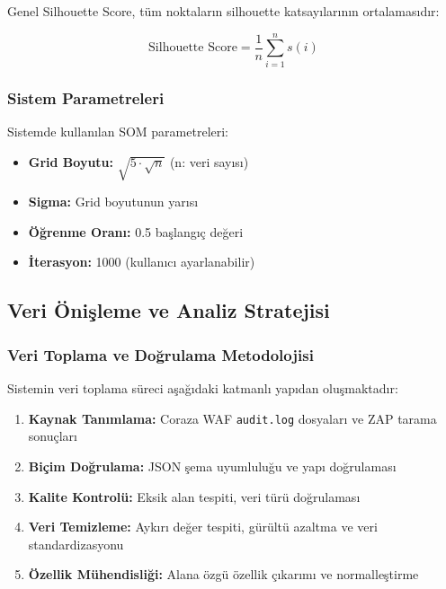 Genel Silhouette Score, tüm noktaların silhouette katsayılarının ortalamasıdır:

\begin{equation}
\text{Silhouette Score} = \frac{1}{n} \sum_{i=1}^{n} s(i)
\label{eq:overall_silhouette}
\end{equation}

\newpage

\subsubsection{Sistem Parametreleri}

Sistemde kullanılan SOM parametreleri:

\begin{itemize}
    \item \textbf{Grid Boyutu:} $\sqrt{5 \cdot \sqrt{n}}$ (n: veri sayısı)
    \item \textbf{Sigma:} Grid boyutunun yarısı
    \item \textbf{Öğrenme Oranı:} 0.5 başlangıç değeri
    \item \textbf{İterasyon:} 1000 (kullanıcı ayarlanabilir)
\end{itemize}

\subsection{Veri Önişleme ve Analiz Stratejisi}

\subsubsection{Veri Toplama ve Doğrulama Metodolojisi}

Sistemin veri toplama süreci aşağıdaki katmanlı yapıdan oluşmaktadır:

\begin{enumerate}
    \item \textbf{Kaynak Tanımlama:} Coraza WAF \texttt{audit.log} dosyaları ve ZAP tarama sonuçları
    \item \textbf{Biçim Doğrulama:} JSON şema uyumluluğu ve yapı doğrulaması
    \item \textbf{Kalite Kontrolü:} Eksik alan tespiti, veri türü doğrulaması
    \item \textbf{Veri Temizleme:} Aykırı değer tespiti, gürültü azaltma ve veri standardizasyonu
    \item \textbf{Özellik Mühendisliği:} Alana özgü özellik çıkarımı ve normalleştirme
\end{enumerate}

